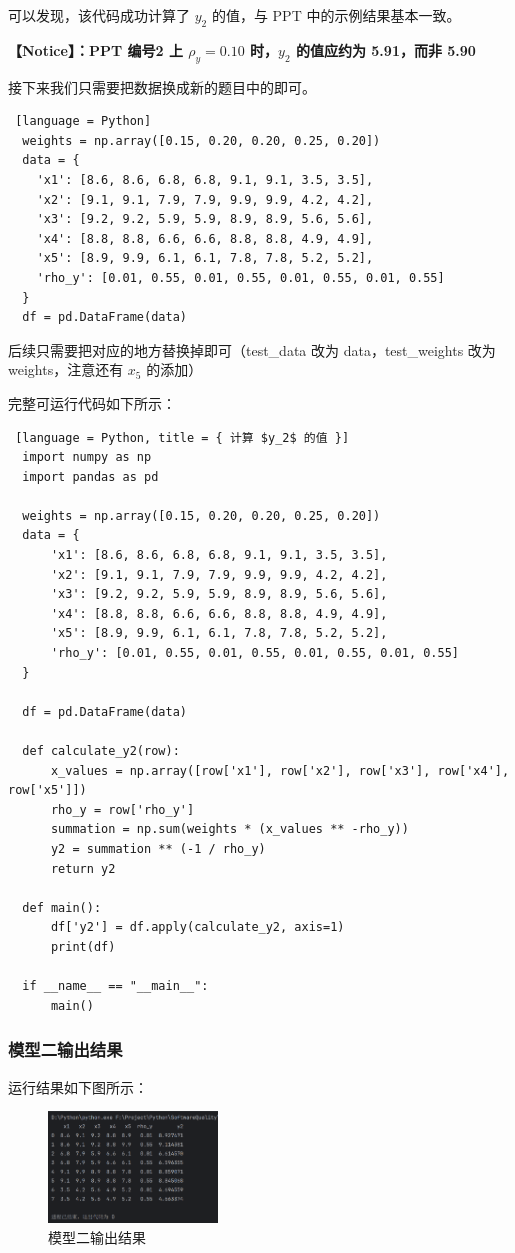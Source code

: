 可以发现，该代码成功计算了 $y_2$ 的值，与 PPT 中的示例结果基本一致。

\textbf{【Notice】：PPT 编号2 上 $\rho_y = 0.10$ 时，$y_2$ 的值应约为 5.91，而非 5.90}

接下来我们只需要把数据换成新的题目中的即可。

\begin{lstlisting} [language = Python]
  weights = np.array([0.15, 0.20, 0.20, 0.25, 0.20])
  data = {
    'x1': [8.6, 8.6, 6.8, 6.8, 9.1, 9.1, 3.5, 3.5],
    'x2': [9.1, 9.1, 7.9, 7.9, 9.9, 9.9, 4.2, 4.2],
    'x3': [9.2, 9.2, 5.9, 5.9, 8.9, 8.9, 5.6, 5.6],
    'x4': [8.8, 8.8, 6.6, 6.6, 8.8, 8.8, 4.9, 4.9],
    'x5': [8.9, 9.9, 6.1, 6.1, 7.8, 7.8, 5.2, 5.2],
    'rho_y': [0.01, 0.55, 0.01, 0.55, 0.01, 0.55, 0.01, 0.55]
  }
  df = pd.DataFrame(data)
\end{lstlisting}

后续只需要把对应的地方替换掉即可（test\_data 改为 data，test\_weights 改为 weights，注意还有 $x_5$ 的添加）

完整可运行代码如下所示：

\begin{lstlisting} [language = Python, title = { 计算 $y_2$ 的值 }]
  import numpy as np
  import pandas as pd
  
  weights = np.array([0.15, 0.20, 0.20, 0.25, 0.20])
  data = {
      'x1': [8.6, 8.6, 6.8, 6.8, 9.1, 9.1, 3.5, 3.5],
      'x2': [9.1, 9.1, 7.9, 7.9, 9.9, 9.9, 4.2, 4.2],
      'x3': [9.2, 9.2, 5.9, 5.9, 8.9, 8.9, 5.6, 5.6],
      'x4': [8.8, 8.8, 6.6, 6.6, 8.8, 8.8, 4.9, 4.9],
      'x5': [8.9, 9.9, 6.1, 6.1, 7.8, 7.8, 5.2, 5.2],
      'rho_y': [0.01, 0.55, 0.01, 0.55, 0.01, 0.55, 0.01, 0.55]
  }

  df = pd.DataFrame(data)

  def calculate_y2(row):
      x_values = np.array([row['x1'], row['x2'], row['x3'], row['x4'], row['x5']])
      rho_y = row['rho_y']
      summation = np.sum(weights * (x_values ** -rho_y))
      y2 = summation ** (-1 / rho_y)
      return y2

  def main():
      df['y2'] = df.apply(calculate_y2, axis=1)
      print(df)

  if __name__ == "__main__":
      main()
\end{lstlisting}

\subsubsection{模型二输出结果}
运行结果如下图所示：
\begin{figure}[H]
  \centering
  \includegraphics[width=0.4\textwidth]{img6/result2.png}
  \caption{模型二输出结果}
\end{figure}

